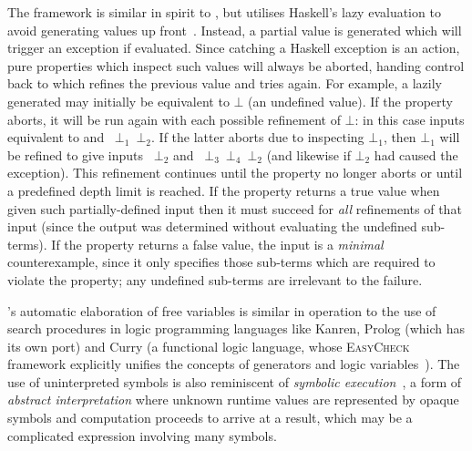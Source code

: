 The \lazysmallcheck{} framework is similar in spirit to
\smallcheck{}, but utilises Haskell's lazy evaluation to avoid generating
values up front~\cite{reich2013advances}. Instead, a partial value is generated
which will trigger an exception if evaluated. Since catching a Haskell exception
is an  action, pure properties which inspect such values will always
be aborted, handing control back to \lazysmallcheck{} which refines the
previous value and tries again. For example, a lazily generated  may
initially be equivalent to $\bot$ (an undefined value). If the property
aborts, it will be run again with each possible refinement of $\bot$: in this
case inputs equivalent to  and ~$\bot_1$~$\bot_2$. If
the latter aborts due to inspecting $\bot_1$, then $\bot_1$ will be refined to
give inputs ~$\bot_2$ and
~$\bot_3$~$\bot_4$\hs{)}~$\bot_2$ (and likewise if $\bot_2$
had caused the exception). This refinement continues until the property no
longer aborts or until a predefined depth limit is reached. If the property
returns a true value when given such partially-defined input then it must
succeed for \emph{all} refinements of that input (since the output was
determined without evaluating the undefined sub-terms). If the property returns
a false value, the input is a \emph{minimal} counterexample, since it only
specifies those sub-terms which are required to violate the property; any
undefined sub-terms are irrelevant to the failure.

\lazysmallcheck{}'s automatic elaboration of free variables is similar in
operation to the use of search procedures in logic programming languages like
Kanren, Prolog (which has its own \quickcheck{} port) and Curry (a
functional logic language, whose \textsc{EasyCheck} framework explicitly
unifies the concepts of generators and logic
variables~\cite{christiansen2008easycheck}). The use of uninterpreted symbols
is also reminiscent of \emph{symbolic execution}~\cite{king1976symbolic}, a form
of \emph{abstract interpretation} where unknown runtime values are represented
by opaque symbols and computation proceeds to arrive at a result, which may be a
complicated expression involving many symbols.
